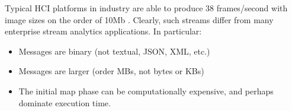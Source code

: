 \documentclass[conference]{IEEEtran}
\begin{document}



Typical HCI platforms in industry are able to produce 38 frames/second with image sizes on the order of 10Mb \cite{lugnegaard2018building}.
Clearly, such streams differ from many enterprise stream analytics applications. In particular: %


\begin{itemize}
\item Messages are binary (not textual, JSON, XML, etc.)
\item Messages are larger (order MBs, not bytes or KBs)
\item The initial map phase can be computationally expensive, and perhaps dominate execution time.
\end{itemize}
\end{document}
